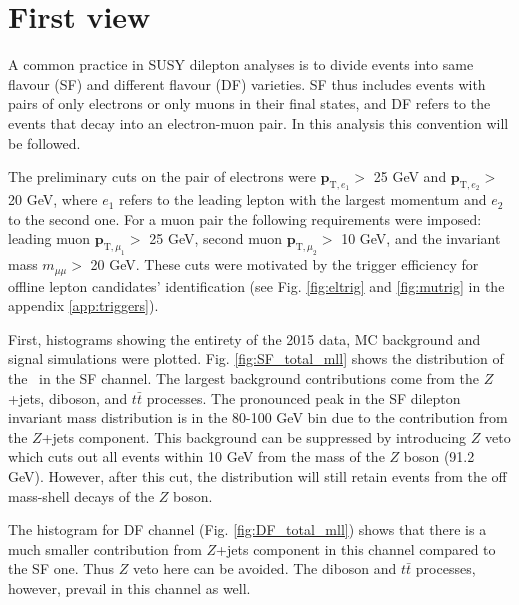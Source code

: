 \section{First view}

A common practice in SUSY dilepton analyses is to divide events into same flavour (SF) and different flavour (DF) varieties. SF thus includes events with pairs of only electrons or only muons in their final states, and DF refers to the events that decay into an electron-muon pair. In this analysis this convention will be followed.

The preliminary cuts on the pair of electrons were $\mathbf{p}_{\text{T},e_1}>$ 25 GeV and $\mathbf{p}_{\text{T},e_2}>$ 20 GeV, where $e_1$ refers to the leading lepton with the largest momentum and $e_2$ to the second one.  For a muon pair the following requirements were imposed: leading muon $\mathbf{p}_{\text{T},\mu_1}>$ 25 GeV, second muon $\mathbf{p}_{\text{T},\mu_2}>$ 10 GeV, and the invariant mass $m_{\mu \mu}>$ 20 GeV. These cuts were motivated by the trigger efficiency for offline lepton candidates' identification (see Fig. \ref{fig:eltrig} and \ref{fig:mutrig} in the appendix \ref{app:triggers}).

First, histograms showing the entirety of the 2015 data, MC background and signal simulations were plotted. Fig. \ref{fig:SF_total_mll} shows the distribution of the \dileptonmass \, in the SF channel. The largest background contributions come from the $Z$+jets, diboson, and $t\bar{t}$ processes. 
The pronounced peak in the SF dilepton invariant mass distribution is in the 80-100 GeV bin due to the contribution from the $Z$+jets component. This background can be suppressed by introducing $Z$ veto which cuts out all events within 10 GeV from the mass of the $Z$ boson (91.2 GeV). However, after this cut, the distribution will still retain events from the off mass-shell decays of the $Z$ boson. 

The histogram for DF channel (Fig. \ref{fig:DF_total_mll}) shows that there is a much smaller contribution from $Z$+jets component in this channel compared to the SF one. Thus $Z$ veto here can be avoided. The diboson and $t\bar{t}$ processes, however, prevail in this channel as well. 

